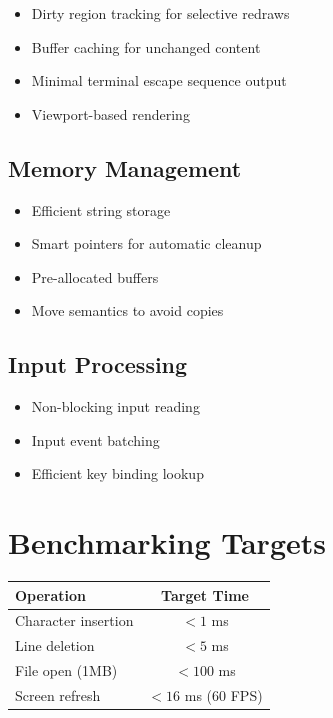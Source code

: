 \documentclass[12pt,a4paper,oneside,openany]{report}
\begin{document}
\begin{itemize}
	\item Dirty region tracking for selective redraws
	\item Buffer caching for unchanged content
	\item Minimal terminal escape sequence output
	\item Viewport-based rendering
\end{itemize}

\subsection{Memory Management}

\begin{itemize}
	\item Efficient string storage
	\item Smart pointers for automatic cleanup
	\item Pre-allocated buffers
	\item Move semantics to avoid copies
\end{itemize}

\subsection{Input Processing}

\begin{itemize}
	\item Non-blocking input reading
	\item Input event batching
	\item Efficient key binding lookup
\end{itemize}

\section{Benchmarking Targets}

\begin{table}[H]
	\centering
	\begin{tabular}{|l|c|}
		\hline
		\textbf{Operation}  & \textbf{Target Time} \\
		\hline
		Character insertion & $< 1$ ms             \\
		\hline
		Line deletion       & $< 5$ ms             \\
		\hline
		File open (1MB)     & $< 100$ ms           \\
		\hline
		Screen refresh      & $< 16$ ms (60 FPS)   \\
		\hline
	\end{tabular}
\end{table}
\end{document}

